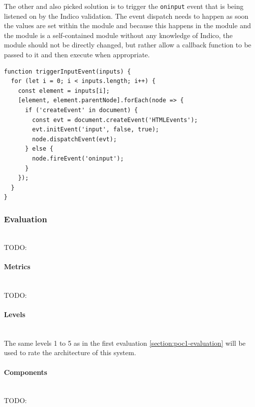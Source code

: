 The other and also picked solution is to trigger the \texttt{oninput} event that is being listened on by the Indico validation. The event dispatch needs to happen as soon the values are set within the module and because this happens in the module and the module is a self-contained module without any knowledge of Indico, the module should not be directly changed, but rather allow a callback function to be passed to it and then execute when appropriate.

\begin{lstlisting}[language=Other,columns=fullflexible, caption={Dispatching the \texttt{oninput} event within a callback.}, label={lst:oninput-callback}]
function triggerInputEvent(inputs) {
  for (let i = 0; i < inputs.length; i++) {
    const element = inputs[i];
    [element, element.parentNode].forEach(node => {
      if ('createEvent' in document) {
        const evt = document.createEvent('HTMLEvents');
        evt.initEvent('input', false, true);
        node.dispatchEvent(evt);
      } else {
        node.fireEvent('oninput');
      }
    });
  }
}
\end{lstlisting}

\subsubsection{Evaluation}\mbox{}\\

TODO:
\vspace{0.5cm}
\paragraph{Metrics}\mbox{}\\

TODO:
\vspace{0.5cm}
\paragraph{Levels}\mbox{}\\

The same levels 1 to 5 as in the first evaluation \ref{section:poc1-evaluation} will be used to rate the architecture of this system.
\vspace{0.5cm}
\paragraph{Components}\mbox{}\\

TODO:
\vspace{0.5cm}
